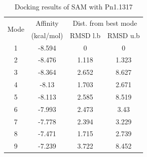 \documentclass[12pt]{article}
\begin{document}
	\begin{table}[h!]
		\centering
		\caption{Docking results of SAM with Pn1.1317}
		\label{table4_1}
		\begin{tabular}{cccc}
			\toprule
			\multirow{2}{*}{Mode} & Affinity & \multicolumn{2}{c}{Dist. from best mode}\\
			&  (kcal/mol) & RMSD l.b & RMSD u.b\\
			\midrule
			1 & -8.594   &       0   &       0\\
			2 & -8.476   &   1.118   &   1.323\\
			3 & -8.364   &   2.652   &   8.627\\
			4 &  -8.13   &   1.703   &   2.671\\
			5 & -8.113   &   2.585   &   8.519\\
			6 & -7.993   &   2.473   &    3.43\\
			7 & -7.778   &   2.394   &   3.229\\
			8 & -7.471   &   1.715   &   2.739\\
			9 & -7.239   &   3.722   &   8.452\\
			\bottomrule
			
		\end{tabular}
	\end{table}
	
\end{document}
